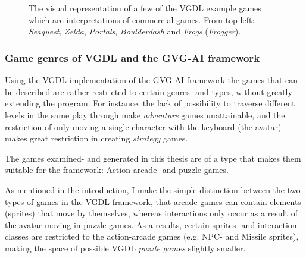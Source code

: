 \documentclass[a4paper,titlepage,final]{report}
\begin{document}
\begin{figure}[!ht]
{    	}\\
	\\
    	\caption{The visual representation of a few of the VGDL example games which are interpretations of commercial games. From top-left: \textit{Seaquest}, \emph{Zelda}, \emph{Portals}, \emph{Boulderdash} and \textit{Frogs} (\textit{Frogger}).}
	\label{fig:gvgai_games_screenshots}
\end{figure}





\subsubsection*{Game genres of VGDL and the GVG-AI framework}
\label{ssec_gamegenres}
Using the VGDL implementation of the GVG-AI framework the games that can be described are rather restricted to certain genres- and types, without greatly extending the program.
For instance, the lack of possibility to traverse different levels in the same play through make \textit{adventure} games unattainable, and the restriction of only moving a single character with the keyboard (the avatar) makes great restriction in creating \textit{strategy} games.

The games examined- and generated in this thesis are of a type that makes them suitable for the framework: Action-arcade- and puzzle games. 

As mentioned in the introduction,  I make the simple distinction between the two types of games in the VGDL framework, that arcade games can contain elements (sprites) that move by themselves, whereas interactions only occur as a result of the avatar moving in puzzle games.
As a results, certain sprites- and interaction classes are restricted to the action-arcade games (e.g. NPC- and Missile sprites), making the space of possible VGDL \textit{puzzle games} slightly smaller.
\end{document}
